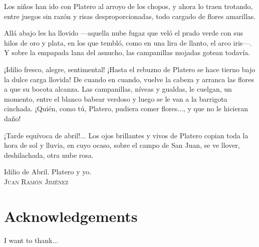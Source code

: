 \documentclass[12pt, twoside]{report}
\begin{document}
\epigraph{Los niños han ido con Platero al arroyo de los chopos, y ahora lo traen trotando, entre juegos sin razón y risas desproporcionadas, todo cargado de flores amarillas.
  
  Allá abajo les ha llovido —aquella nube fugaz que veló el prado verde con sus hilos de oro y plata, en los que tembló, como en una lira de llanto, el arco iris—. Y sobre la empapada lana del asnucho, las campanillas mojadas gotean todavía.

  ¡Idilio fresco, alegre, sentimental! ¡Hasta el rebuzno de Platero se hace tierno bajo la dulce carga llovida! De cuando en cuando, vuelve la cabeza y arranca las flores a que su bocota alcanza. Las campanillas, níveas y gualdas, le cuelgan, un momento, entre el blanco babear verdoso y luego se le van a la barrigota cinchada. ¡Quién, como tú, Platero, pudiera comer flores..., y que no le hicieran daño!

    ¡Tarde equívoca de abril!... Los ojos brillantes y vivos de Platero copian toda la hora de sol y lluvia, en cuyo ocaso, sobre el campo de San Juan, se ve llover, deshilachada, otra nube rosa.}{Idilio de Abril. Platero y yo. \\ \textsc{Juan Ramón Jiménez}}


\chapter*{Acknowledgements}
I want to thank...
\end{document}
